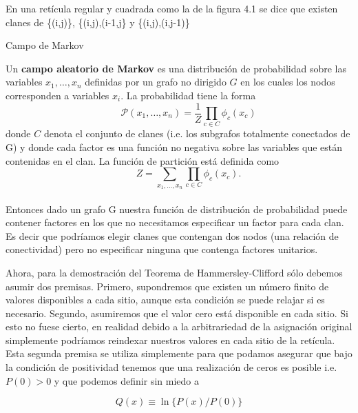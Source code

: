 \begin{example}
    En una retícula regular y cuadrada como la de la figura 4.1 se dice que existen clanes de \{(i,j)\}, \{(i,j),(i-1,j\} y \{(i,j),(i,j-1)\}
\end{example}

\begin{definition}{Campo de Markov}
    
    Un \textbf{campo aleatorio de Markov} es una distribución de probabilidad sobre las variables  $x _ { 1 } , \ldots , x _ { n } $ definidas por un grafo no dirigido $G$ en los cuales los nodos corresponden a variables $ x _ { i }$. La probabilidad tiene la forma \\ 
    $${ \qquad \mathcal{P} \left( x _ { 1 } , \ldots , x _ { n } \right) = \frac { 1 } { Z } \prod _ { \mathrm { c } \in C } \phi _ { c } \left( x _ { c } \right) } $$
    donde $C$ denota el conjunto de clanes (i.e. los subgrafos totalmente conectados de G) y donde cada factor es una función no negativa sobre las variables que están contenidas en el clan. La función de partición está definida como\\ 
    $${ \qquad Z = \sum _ { x _ { 1 } , \ldots , x _ { n } } \prod _ { c \in C } \phi _ { c } \left( x _ { c } \right) }.$$ \\ 
    Entonces dado un grafo G nuestra función de distribución de probabilidad puede contener factores en los que no necesitamos especificar un factor para cada clan. %
    Es decir que podríamos elegir clanes que contengan dos nodos (una relación de conectividad) pero no especificar ninguna que contenga factores unitarios.
    
    


\end{definition}

Ahora, para la demostración del Teorema de Hammersley-Clifford sólo debemos asumir dos premisas. Primero, supondremos que existen un número finito de valores disponibles a cada sitio, aunque esta condición se puede relajar si es necesario. Segundo, asumiremos que el valor cero está disponible en cada sitio. Si esto no fuese cierto, en realidad debido a la arbitrariedad de la asignación original simplemente podríamos reindexar nuestros valores en cada sitio de la retícula. Esta segunda premisa se utiliza simplemente para que podamos asegurar que bajo la condición de positividad tenemos que una realización de ceros es posible i.e. $P(0)>0$ y que podemos definir sin miedo a 

\begin{equation}
        Q(x) \equiv \ln \{P(x)/P(0)\}
\end{equation}

